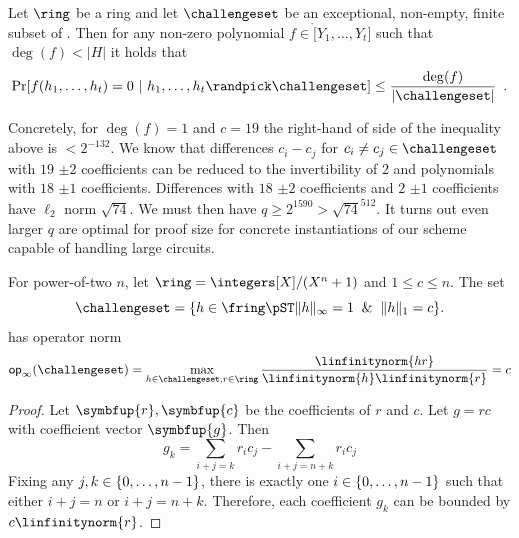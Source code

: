 \begin{theorem}
\label{thm:alon-furedi}
Let $\ring$ be a ring and let $\challengeset$ be an exceptional, non-empty, finite subset of \ring. Then for any non-zero polynomial $f \in \ring[Y_1,\ldots,Y_t]$ such that $\deg(f) < |H|$ it holds that
\[
        \Pr[f(h_1,\ldots,h_t) = 0  \ | \ h_1,\dots,h_t \randpick \challengeset] \leq \frac{\deg(f)}{\vert\challengeset\vert}
        \enspace.
\]
\end{theorem}

Concretely, for $\deg(f)=1$ and $c=19$ the right-hand of side of the inequality above is $<2^{-132}$. We know that differences $c_i - c_j$ for $c_i \neq c_j \in \challengeset$ with $19$ $\pm 2$ coefficients can be reduced to the invertibility of $2$ and polynomials with $18$ $\pm 1$ coefficients. Differences with $18$ $\pm 2$ coefficients and $2$ $\pm 1$ coefficients have $\ell_2$ norm $\sqrt{74}$. We must then have $q \geq 2^{1590} > \sqrt{74}^{512}$. It turns out even larger $q$ are optimal for proof size for concrete instantiations of our scheme capable of handling large circuits.

\begin{lemma}
        \label{lemma:op-norm}
        For power-of-two $n$, let $\ring = \integers[X]/(X^{n}+1)$ and $1 \leq c \leq n$. The set
        \[
                \challengeset = \set{h \in \fring \pST \|h\|_{\infty} = 1 \And \|h\|_1 = c}.
        \]
        \noindent has operator norm
        \[
                \textsf{op}_{\infty}(\challengeset) = \max_{h \in \challengeset, r \in \ring} \frac{\linfinitynorm{hr}}{\linfinitynorm{h}\linfinitynorm{r}} = c
        \]
\end{lemma}
\begin{proof}
Let $\symbfup{r},\symbfup{c}$ be the coefficients of $r$ and $c$. Let $g = rc$ with coefficient vector $\symbfup{g}$. Then
\[
g_k = \sum_{i+j = k} r_i c_j - \sum_{i+j = n + k} r_i c_j
\]
Fixing any $j,k \in \set{0,\dotsc,n-1}$, there is exactly one $i \in \set{0,\dotsc,n-1}$ such that either $i+j = n$ or $i+j = n + k$. Therefore, each coefficient $g_k$ can be bounded by $c \linfinitynorm{r}$.
\end{proof}

